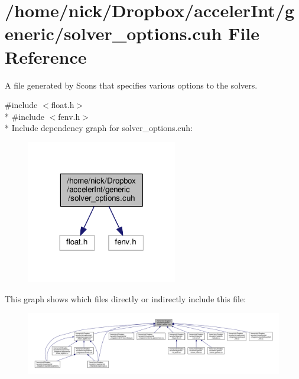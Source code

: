 \hypertarget{solver__options_8cuh}{}\section{/home/nick/\+Dropbox/acceler\+Int/generic/solver\+\_\+options.cuh File Reference}
\label{solver__options_8cuh}


A file generated by Scons that specifies various options to the solvers.  


{\ttfamily \#include $<$float.\+h$>$}\\*
{\ttfamily \#include $<$fenv.\+h$>$}\\*
Include dependency graph for solver\+\_\+options.\+cuh\+:
\nopagebreak
\begin{figure}[H]
\begin{center}
\leavevmode
\includegraphics[width=186pt]{solver__options_8cuh__incl}
\end{center}
\end{figure}
This graph shows which files directly or indirectly include this file\+:
\nopagebreak
\begin{figure}[H]
\begin{center}
\leavevmode
\includegraphics[width=350pt]{solver__options_8cuh__dep__incl}
\end{center}
\end{figure}
